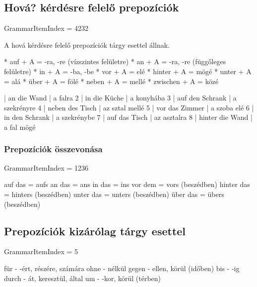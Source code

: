 \documentclass{article}
\newenvironment{desc}{\verbatim}{\endverbatim}
\newenvironment{exmp}{\verbatim}{\endverbatim}
\begin{document}
\subsection{Hová? kérdésre felelő prepozíciók}

GrammarItemIndex = 4232

\begin{desc}
A hová kérdésre felelő prepozíciók tárgy esettel állnak.

* auf + A = -ra, -re (vízszintes felületre)
* an + A = -ra, -re (függőleges felületre)
* in + A = -ba, -be
* vor + A = elé
* hinter + A = mögé
* unter + A = alá
* über + A = fölé
* neben + A = mellé
* zwischen + A = közé
\end{desc}

\begin{exmp}
1 | an die Wand | a falra
2 | in die Küche | a konyhába
3 | auf den Schrank | a szekrényre
4 | neben des Tisch | az sztal mellé
5 | vor das Zimmer | a szoba elé
6 | in den Schrank | a szekrénybe
7 | auf das Tisch | az asztalra
8 | hinter die Wand | a fal mögé
\end{exmp}

\subsubsection{Prepozíciók összevonása}

GrammarItemIndex = 1236

\begin{desc}

auf das = aufs
an das = ans
in das = ins
vor dem = vors (beszédben)
hinter das = hinters (beszédben)
unter das = unters (beszédben)
über das = übers (beszédben)

\end{desc}

\subsection{Prepozíciók kizárólag tárgy esettel}

GrammarItemIndex = 5

\begin{desc}


für - -ért, részére, számára
ohne - nélkül
gegen - ellen, körül (időben)
bis - -ig
durch - át, keresztül, által
um - -kor, körül (térben)


\end{desc}
\end{document}
